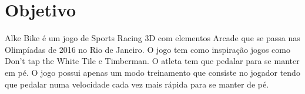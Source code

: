 \chapter[Objetivo]{Objetivo}

Alke Bike é um jogo de Sports Racing 3D com elementos Arcade que se passa nas Olimpíadas de 2016 no Rio de Janeiro. O jogo tem como inspiração jogos como Don't tap the White Tile e Timberman. O atleta tem que pedalar para se manter em pé. O jogo possui apenas um modo treinamento que consiste no jogador tendo que pedalar numa velocidade cada vez mais rápida para se manter de pé.

